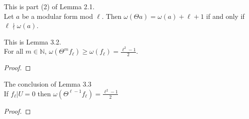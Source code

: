 \begin{theorem}
  \label{thm:Filt_Theta_iff}
  \leanok
  This is part (2) of Lemma 2.1. \\
  Let $a$ be a modular form mod $\ell$. Then $\omega (\Theta a) = \omega (a) + \ell + 1$ 
  if and only if $\ell \nmid \omega (a).$
\end{theorem}




\begin{theorem}
  \label{thm:le_Filt_Theta_fl}
  \leanok
  This is Lemma 3.2. \\
  For all $m \in \mathbb{N}$, $\omega (\Theta^m f_\ell) \ge \omega (f_\ell) = \frac{\ell^2 - 1}{2}.$
\end{theorem} 
\begin{proof}
  \leanok
\end{proof}





\begin{theorem}
  \label{thm:Filtration_Theta_pow_sub_one}
  \leanok
  The conclusion of Lemma 3.3 \\
  If $f_\ell | U = 0$ then $\omega (\Theta^{\ell - 1} f_\ell) = \frac{\ell ^ 2 - 1}{2}$
\end{theorem}
\begin{proof}
  \leanok
\end{proof}


